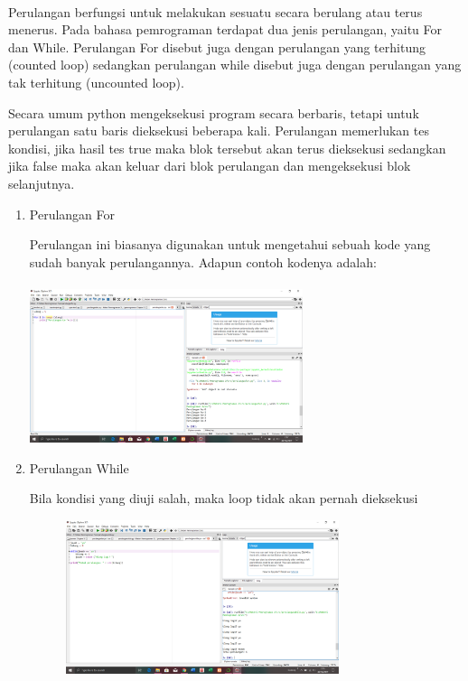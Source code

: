 \documentclass{article}
\begin{document}
\paragraph{}
            Perulangan berfungsi untuk melakukan sesuatu secara berulang atau terus menerus. Pada bahasa pemrograman terdapat dua jenis perulangan, yaitu For dan While. Perulangan For disebut juga dengan perulangan yang terhitung (counted loop) sedangkan perulangan while disebut juga dengan perulangan yang tak terhitung (uncounted loop).
            \par
            Secara umum python mengeksekusi program secara berbaris, tetapi untuk perulangan satu baris dieksekusi beberapa kali. Perulangan memerlukan tes kondisi, jika hasil tes true maka blok tersebut akan terus dieksekusi sedangkan jika false maka akan keluar dari blok perulangan dan mengeksekusi blok selanjutnya.
\begin{enumerate}
\item Perulangan For
    \par Perulangan ini biasanya digunakan untuk mengetahui sebuah kode yang sudah banyak perulangannya. Adapun contoh kodenya adalah:
    \paragraph{}
                 \centerline{\includegraphics[width=8cm]{figures/perulanganfor.png}}
    
    \item Perulangan While
    \par Bila kondisi yang diuji salah, maka loop tidak akan pernah dieksekusi
    \begin{figure}[h]
                 \centerline{\includegraphics[width=8cm]{figures/perulanganwhile.png}}
        \end{figure}

\end{enumerate}
\end{document}
